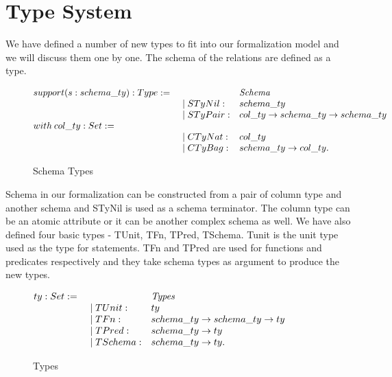 \section{Type System}
\label{sec:types}

We have defined a number of new types to fit into our formalization model and we will discuss them one by one. The schema of the relations are defined as a type.

\begin{figure}
\begin{center}
$\begin{array}{@{}l@{~}l@{\quad}l@{\!\!\!\!\!\!}r}
support (s : schema\_ty): Type := & & \emph{Schema} \\
& \quad \mid STyNil: & schema\_ty\\
& \quad \mid STyPair: & col\_ty \rightarrow schema\_ty \rightarrow schema\_ty\\
with \:col\_ty : Set := & & \\
& \quad \mid CTyNat: & col\_ty\\
& \quad \mid CTyBag: & schema\_ty \rightarrow col\_ty. \\
\end{array}
$
\end{center}
\caption{Schema Types}
\label{fig-schema_types}
\end{figure}

Schema in our formalization can be constructed from a pair of column type and another schema and STyNil is used as a schema terminator. The column type can be an atomic attribute or it can be another complex schema as well. We have also defined four basic types - TUnit, TFn, TPred, TSchema. Tunit is the unit type used as the type for statements. TFn and TPred are used for functions and predicates respectively and they take schema types as argument to produce the new types.

\begin{figure}
\begin{center}
$\begin{array}{@{}l@{~}l@{\quad}l@{\!\!\!\!\!\!}r}
ty : Set := & \ \ \ \ \ & \emph{Types} \\
& \quad \mid TUnit: & ty\\
& \quad \mid TFn: & schema\_ty \rightarrow schema\_ty \rightarrow ty\\
& \quad \mid TPred: & schema\_ty \rightarrow ty\\
& \quad \mid TSchema: & schema\_ty \rightarrow ty. \\
\end{array}
$
\end{center}
\caption{Types}
\label{fig-types}
\end{figure} 

